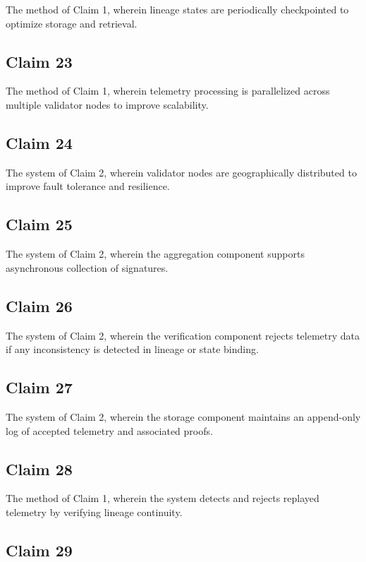 The method of Claim 1, wherein lineage states are periodically checkpointed to optimize storage and retrieval.

\subsection{Claim 23}

The method of Claim 1, wherein telemetry processing is parallelized across multiple validator nodes to improve scalability.

\subsection{Claim 24}

The system of Claim 2, wherein validator nodes are geographically distributed to improve fault tolerance and resilience.

\subsection{Claim 25}

The system of Claim 2, wherein the aggregation component supports asynchronous collection of signatures.

\subsection{Claim 26}

The system of Claim 2, wherein the verification component rejects telemetry data if any inconsistency is detected in lineage or state binding.

\subsection{Claim 27}

The system of Claim 2, wherein the storage component maintains an append-only log of accepted telemetry and associated proofs.

\subsection{Claim 28}

The method of Claim 1, wherein the system detects and rejects replayed telemetry by verifying lineage continuity.

\subsection{Claim 29}

